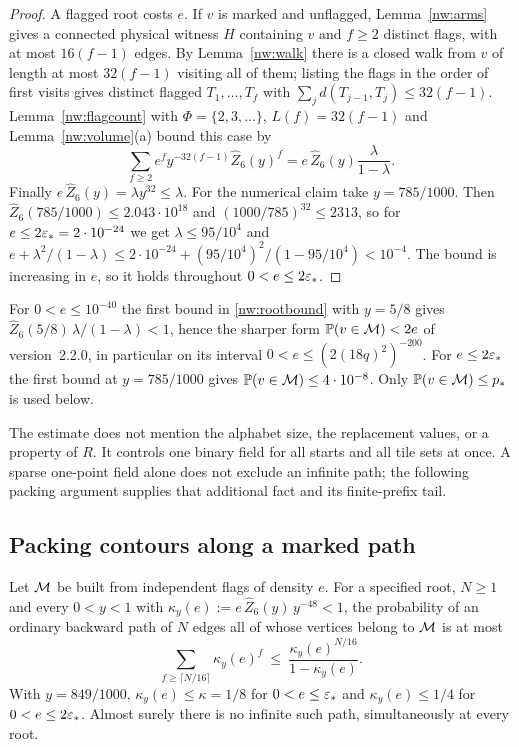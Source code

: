 \begin{proof}
A flagged root costs $e$. If $v$ is marked and unflagged, Lemma~\ref{nw:arms} gives a connected
physical witness $H$ containing $v$ and $f\ge2$ distinct flags, with at most $16(f-1)$ edges. By
Lemma~\ref{nw:walk} there is a closed walk from $v$ of length at most $32(f-1)$ visiting all of
them; listing the flags in the order of first visits gives distinct flagged $T_1,\dots,T_f$ with
$\sum_jd(T_{j-1},T_j)\le32(f-1)$. Lemma~\ref{nw:flagcount} with $\Phi=\{2,3,\dots\}$,
$L(f)=32(f-1)$ and Lemma~\ref{nw:volume}(a) bound this case by
\[
  \sum_{f\ge2}e^fy^{-32(f-1)}\widehat Z_6(y)^f=e\,\widehat Z_6(y)\frac{\lambda}{1-\lambda}.
\]
Finally $e\,\widehat Z_6(y)=\lambda y^{32}\le\lambda$. For the numerical claim take $y=785/1000$.
Then $\widehat Z_6(785/1000)\le2.043\cdot10^{18}$ and $(1000/785)^{32}\le2313$, so for
$e\le2\varepsilon_*=2\cdot10^{-24}$ we get $\lambda\le95/10^4$ and
$e+\lambda^2/(1-\lambda)\le2\cdot10^{-24}+(95/10^4)^2/(1-95/10^4)<10^{-4}$. The bound is increasing
in $e$, so it holds throughout $0<e\le2\varepsilon_*$.
\end{proof}

\begin{remark*}
For $0<e\le10^{-40}$ the first bound in \eqref{nw:rootbound} with $y=5/8$ gives
$\widehat Z_6(5/8)\,\lambda/(1-\lambda)<1$, hence the sharper form $\mathbb{P}(v\in \mathcal M)<2e$ of
version~2.2.0, in particular on its interval $0<e\le(2(18q)^2)^{-200}$. For
$e\le2\varepsilon_*$ the first bound at $y=785/1000$ gives $\mathbb{P}(v\in \mathcal M)\le4\cdot10^{-8}$. Only
$\mathbb{P}(v\in \mathcal M)\le p_*$ is used below.
\end{remark*}

The estimate does not mention the alphabet size, the replacement values, or a property of $R$. It controls one binary field for all starts and all tile sets at once. A sparse one-point field alone does not exclude an infinite path; the following packing argument supplies that additional fact and its finite-prefix tail.

\subsection{Packing contours along a marked path}

\begin{lemma}\label{nw:paths}
Let $\mathcal M$ be built from independent flags of density $e$. For a specified root, $N\ge1$ and every
$0<y<1$ with $\kappa_y(e):=e\,\widehat Z_6(y)\,y^{-48}<1$, the probability of an ordinary backward
path of $N$ edges all of whose vertices belong to $\mathcal M$ is at most
\begin{equation}\label{nw:pathtail}
  \sum_{f\ge\lceil N/16\rceil}\kappa_y(e)^f\ \le\ \frac{\kappa_y(e)^{N/16}}{1-\kappa_y(e)} .
\end{equation}
With $y=849/1000$, $\kappa_y(e)\le\kappa=1/8$ for $0<e\le\varepsilon_*$ and
$\kappa_y(e)\le1/4$ for $0<e\le2\varepsilon_*$. Almost surely there is no infinite such path,
simultaneously at every root.
\end{lemma}

